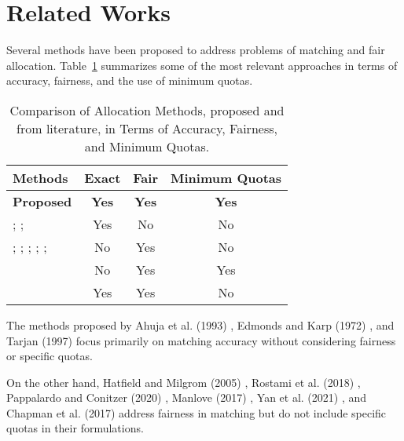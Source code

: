     \section{Related Works}
        Several methods have been proposed to address problems of matching and fair allocation. Table~\ref{tab:related_work} summarizes some of the most relevant approaches in terms of accuracy, fairness, and the use of minimum quotas.
        
        \begin{table}[ht]
          \centering
          \begin{tabular}{lccc}
            \toprule
            Methods & Exact & Fair & Minimum Quotas \\
            \midrule
            \textbf{Proposed} & \textbf{Yes} & \textbf{Yes} & \textbf{Yes} \\
            \cite{ahuja1993network}; \cite{edmonds1972theoretical}; \cite{tarjan1997dynamic} & Yes & No & No \\
            \cite{hatfield2005matching}; \cite{rostami2018matching}; \cite{pappalardo2020combining}; \cite{manlove2017algorithmics}; \cite{yan2021evolutionary}; \cite{chapman2017multi} & No & Yes & No \\
            \cite{sankar2021set} & No & Yes & Yes \\
            \cite{garcia2020fair} & Yes & Yes & No \\
            \bottomrule
          \end{tabular}
          \caption{Comparison of Allocation Methods, proposed and from literature, in Terms of Accuracy, Fairness, and Minimum Quotas.}
          \label{tab:related_work}
        \end{table}
        
        The methods proposed by Ahuja et al. (1993) \cite{ahuja1993network}, Edmonds and Karp (1972) \cite{Karp1972}, and Tarjan (1997) \cite{tarjan1997dynamic} focus primarily on matching accuracy without considering fairness or specific quotas.
        
        On the other hand, Hatfield and Milgrom (2005) \cite{hatfield2005matching}, Rostami et al. (2018) \cite{rostami2018matching}, Pappalardo and Conitzer (2020) \cite{pappalardo2020combining}, Manlove (2017) \cite{manlove2017algorithmics}, Yan et al. (2021) \cite{yan2021evolutionary}, and Chapman et al. (2017) \cite{chapman2017multi} address fairness in matching but do not include specific quotas in their formulations.
        
